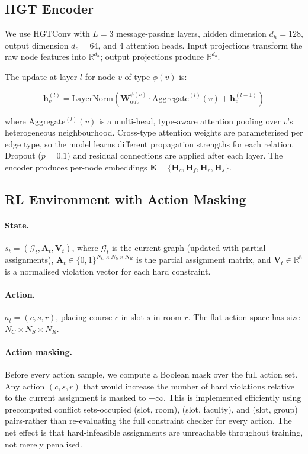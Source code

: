 \documentclass[conference]{IEEEtran}
\begin{document}
\subsection{HGT Encoder}

We use HGTConv \cite{hu2020hgt} with $L=3$ message-passing layers, hidden dimension $d_h=128$, output dimension $d_o=64$, and 4 attention heads. Input projections transform the raw node features into $\mathbb{R}^{d_h}$; output projections produce $\mathbb{R}^{d_o}$.

The update at layer $l$ for node $v$ of type $\phi(v)$ is:

\begin{equation}
\mathbf{h}_v^{(l)} = \mathrm{LayerNorm}\!\left(
  \mathbf{W}_\text{out}^{\phi(v)} \cdot \mathrm{Aggregate}^{(l)}(v)
  + \mathbf{h}_v^{(l-1)} \right)
\label{eq:hgt}
\end{equation}

\noindent where Aggregate$^{(l)}(v)$ is a multi-head, type-aware attention pooling over $v$'s heterogeneous neighbourhood. Cross-type attention weights are parameterised per edge type, so the model learns different propagation strengths for each relation. Dropout ($p=0.1$) and residual connections are applied after each layer. The encoder produces per-node embeddings $\mathbf{E} = \{\mathbf{H}_c, \mathbf{H}_f, \mathbf{H}_r, \mathbf{H}_s\}$.

\subsection{RL Environment with Action Masking}

\paragraph{State.} $s_t = (\mathcal{G}_t, \mathbf{A}_t, \mathbf{V}_t)$, where $\mathcal{G}_t$ is the current graph (updated with partial assignments), $\mathbf{A}_t \in \{0,1\}^{N_C \times N_S \times N_R}$ is the partial assignment matrix, and $\mathbf{V}_t \in \mathbb{R}^8$ is a normalised violation vector for each hard constraint.

\paragraph{Action.} $a_t = (c, s, r)$, placing course $c$ in slot $s$ in room $r$. The flat action space has size $N_C \times N_S \times N_R$.

\paragraph{Action masking.} Before every action sample, we compute a Boolean mask over the full action set. Any action $(c, s, r)$ that would increase the number of hard violations relative to the current assignment is masked to $-\infty$. This is implemented efficiently using precomputed conflict sets-occupied (slot, room), (slot, faculty), and (slot, group) pairs-rather than re-evaluating the full constraint checker for every action. The net effect is that hard-infeasible assignments are unreachable throughout training, not merely penalised.
\end{document}

